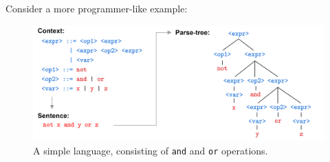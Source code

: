     \vspace{-.5em}
    \noindent
        Consider a more programmer-like example:

        \begin{figure}[h]
            \centering
            \includegraphics[width=1\textwidth]{Sections/Formal/bnf2.png}
            \caption{A simple language, consisting of \texttt{and} and \texttt{or} operations.}
        \end{figure}

\newpage
